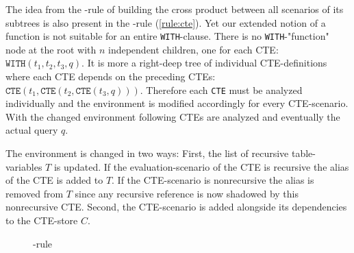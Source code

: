 The idea from the \REXPR-rule of building the cross product between all scenarios of its subtrees is also present in the \RCTE-rule (\autoref{rule:cte}). Yet our extended notion of a function is not suitable for an entire \texttt{WITH}-clause. There is no \texttt{WITH}-"function" node at the root with $n$ independent children, one for each CTE: $\texttt{WITH}(t_1, t_2, t_3, q)$. It is more a right-deep tree of individual CTE-definitions where each CTE depends on the preceding CTEs: $\texttt{CTE}(t_1, \texttt{CTE}(t_2, \texttt{CTE}(t_3, q)))$. Therefore each \texttt{CTE} must be analyzed individually and the environment is modified accordingly for every CTE-scenario. With the changed environment following CTEs are analyzed and eventually the actual query $q$.

The environment is changed in two ways: First, the list of recursive table-variables $T$ is updated. If the evaluation-scenario of the CTE is recursive the alias of the CTE is added to $T$. If the CTE-scenario is nonrecursive the alias is removed from $T$ since any recursive reference is now shadowed by this nonrecursive CTE. Second, the CTE-scenario is added alongside its dependencies to the CTE-store $C$.

\begin{figure}[h!]
    \centering\footnotesize
{}
    \caption{\RCTE-rule}
    \label{rule:cte}
\end{figure}

